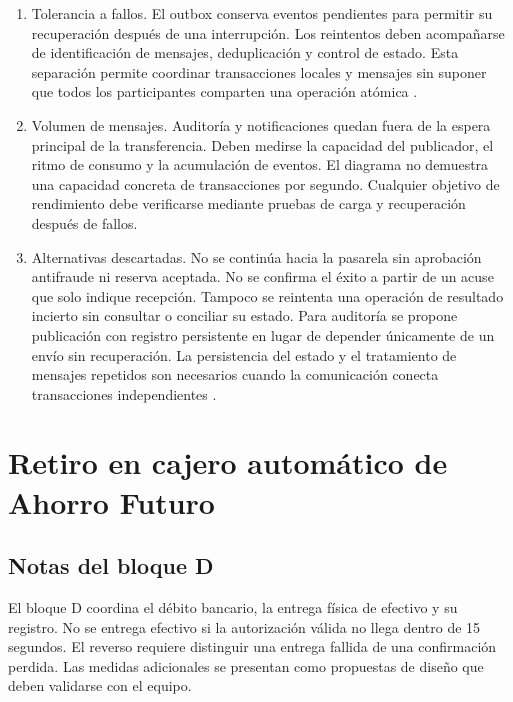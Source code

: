 \documentclass[12pt,a4paper]{article}
\begin{document}
\begin{enumerate}
    \item Tolerancia a fallos.
    El outbox conserva eventos pendientes para permitir
    su recuperación después de una interrupción. Los
    reintentos deben acompañarse de identificación de
    mensajes, deduplicación y control de estado.
    Esta separación permite coordinar transacciones
    locales y mensajes sin suponer que todos los
    participantes comparten una operación atómica
    \cite{helland2017}.

    \item Volumen de mensajes.
    Auditoría y notificaciones quedan fuera de la espera
    principal de la transferencia. Deben medirse la
    capacidad del publicador, el ritmo de consumo y la
    acumulación de eventos. El diagrama no demuestra una
    capacidad concreta de transacciones por segundo.
    Cualquier objetivo de rendimiento debe verificarse
    mediante pruebas de carga y recuperación después
    de fallos.

    \item Alternativas descartadas.
    No se continúa hacia la pasarela sin aprobación
    antifraude ni reserva aceptada. No se confirma el éxito
    a partir de un acuse que solo indique recepción.
    Tampoco se reintenta una operación de resultado incierto
    sin consultar o conciliar su estado. Para auditoría se
    propone publicación con registro persistente en lugar
    de depender únicamente de un envío sin recuperación.
    La persistencia del estado y el tratamiento de mensajes
    repetidos son necesarios cuando la comunicación conecta
    transacciones independientes \cite{helland2017}.

\end{enumerate}



\section{Retiro en cajero automático de Ahorro Futuro}

\subsection{Notas del bloque D}

El bloque D coordina el débito bancario, la entrega física de efectivo y su registro. No se entrega efectivo si la autorización válida no llega dentro de 15 segundos. El reverso requiere distinguir una entrega fallida de una confirmación perdida. Las medidas adicionales se presentan como propuestas de diseño que deben validarse con el equipo.
\end{document}
